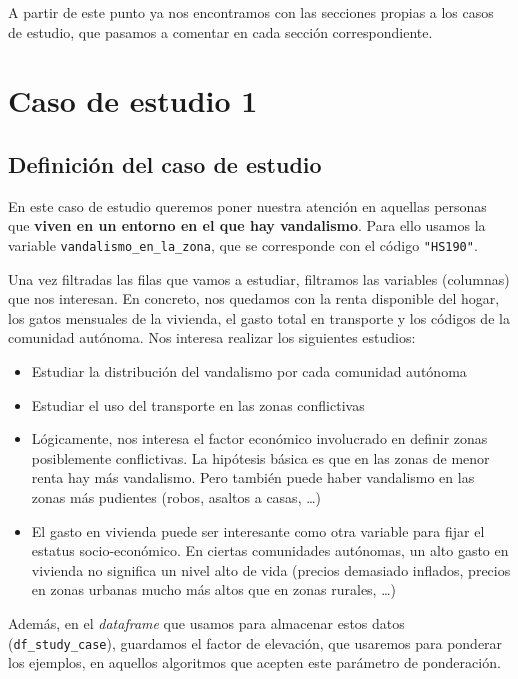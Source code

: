 \documentclass[11pt]{article}
\begin{document}
A partir de este punto ya nos encontramos con las secciones propias a los casos de estudio, que pasamos a comentar en cada sección correspondiente.

\pagebreak

\section{Caso de estudio 1}

\subsection{Definición del caso de estudio}

En este caso de estudio queremos poner nuestra atención en aquellas personas que \textbf{viven en un entorno en el que hay vandalismo}. Para ello usamos la variable \lstinline{vandalismo_en_la_zona}, que se corresponde con el código \lstinline{"HS190"}.

Una vez filtradas las filas que vamos a estudiar, filtramos las variables (columnas) que nos interesan. En concreto, nos quedamos con la renta disponible del hogar, los gatos mensuales de la vivienda, el gasto total en transporte y los códigos de la comunidad autónoma. Nos interesa realizar los siguientes estudios:

\begin{itemize}
    \item Estudiar la distribución del vandalismo por cada comunidad autónoma
    \item Estudiar el uso del transporte en las zonas conflictivas
    \item Lógicamente, nos interesa el factor económico involucrado en definir zonas posiblemente conflictivas. La hipótesis básica es que en las zonas de menor renta hay más vandalismo. Pero también puede haber vandalismo en las zonas más pudientes (robos, asaltos a casas, \ldots)
    \item El gasto en vivienda puede ser interesante como otra variable para fijar el estatus socio-económico. En ciertas comunidades autónomas, un alto gasto en vivienda no significa un nivel alto de vida (precios demasiado inflados, precios en zonas urbanas mucho más altos que en zonas rurales, \ldots)
\end{itemize}

Además, en el \emph{dataframe} que usamos para almacenar estos datos (\lstinline{df_study_case}), guardamos el factor de elevación, que usaremos para ponderar los ejemplos, en aquellos algoritmos que acepten este parámetro de ponderación.
\end{document}
